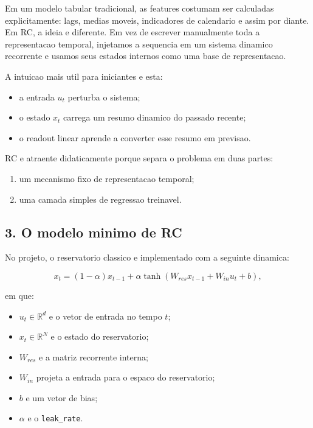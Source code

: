 \documentclass[12pt]{article}
\providecommand{\tightlist}{%
          \setlength{\itemsep}{0pt}\setlength{\parskip}{0pt}}
\begin{document}
Em um modelo tabular tradicional, as features costumam ser calculadas explicitamente: lags, medias moveis, indicadores de calendario e assim por diante. Em RC, a ideia e diferente. Em vez de escrever manualmente toda a representacao temporal, injetamos a sequencia em um sistema dinamico recorrente e usamos seus estados internos como uma base de representacao.

A intuicao mais util para iniciantes e esta:

\begin{itemize}
\tightlist
\item
  a entrada \(u_t\) perturba o sistema;
\item
  o estado \(x_t\) carrega um resumo dinamico do passado recente;
\item
  o readout linear aprende a converter esse resumo em previsao.
\end{itemize}

RC e atraente didaticamente porque separa o problema em duas partes:

\begin{enumerate}
\def\labelenumi{\arabic{enumi}.}
\tightlist
\item
  um mecanismo fixo de representacao temporal;
\item
  uma camada simples de regressao treinavel.
\end{enumerate}

\subsection{3. O modelo minimo de RC}\label{3-o-modelo-minimo-de-rc}

No projeto, o reservatorio classico e implementado com a seguinte dinamica:

\[
x_t = (1 - \alpha) x_{t-1} + \alpha \tanh(W_{res} x_{t-1} + W_{in} u_t + b),
\]

em que:

\begin{itemize}
\tightlist
\item
  \(u_t \in \mathbb{R}^d\) e o vetor de entrada no tempo \(t\);
\item
  \(x_t \in \mathbb{R}^N\) e o estado do reservatorio;
\item
  \(W_{res}\) e a matriz recorrente interna;
\item
  \(W_{in}\) projeta a entrada para o espaco do reservatorio;
\item
  \(b\) e um vetor de bias;
\item
  \(\alpha\) e o \texttt{leak\_rate}.
\end{itemize}
\end{document}
